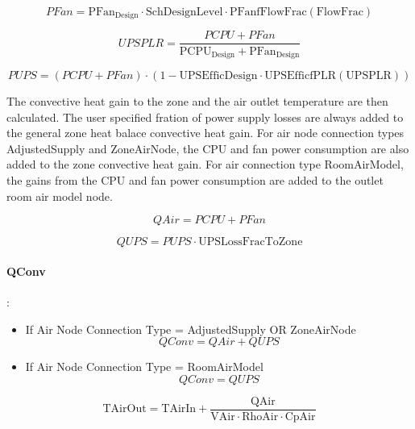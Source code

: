 \begin{equation}
PFan = \textrm{PFan}_{\textrm{Design}} \cdot \textrm{SchDesignLevel} \cdot \textrm{PFanfFlowFrac}(\textrm{FlowFrac})
\end{equation}

\begin{equation}
UPSPLR = \frac{PCPU + PFan}{\textrm{PCPU}_{\textrm{Design}} + \textrm{PFan}_{\textrm{Design}}}
\end{equation}

\begin{equation}
PUPS = (PCPU + PFan) \cdot (1 - \textrm{UPSEfficDesign} \cdot \textrm{UPSEfficfPLR} (\textrm{UPSPLR}))
\end{equation}

The convective heat gain to the zone and the air outlet temperature are then calculated. The user specified fration of power supply losses are always added to the general zone heat balace convective heat gain. For air node connection types AdjustedSupply and ZoneAirNode, the CPU and fan power consumption are also added to the zone convective heat gain. For air connection type RoomAirModel, the gains from the CPU and fan power consumption are added to the outlet room air model node.

\begin{equation}
QAir = PCPU + PFan
\end{equation}

\begin{equation}
QUPS = PUPS \cdot \textrm{UPSLossFracToZone}
\end{equation}

\paragraph{QConv}:

\begin{itemize}
    \tightlist
  \item
    If Air Node Connection Type = AdjustedSupply OR ZoneAirNode
\begin{equation}
QConv = QAir + QUPS
\end{equation}
  \item
    If Air Node Connection Type = RoomAirModel
\begin{equation}
QConv = QUPS
\end{equation}
\end{itemize}

\begin{equation}
\textrm{TAirOut} = \textrm{TAirIn} + \frac{\textrm{QAir}}{\textrm{VAir} \cdot \textrm{RhoAir} \cdot \textrm{CpAir}}
\end{equation}

